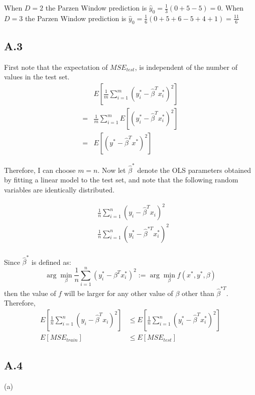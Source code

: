 \documentclass{article}
\begin{document}
    When $D=2$ the Parzen Window prediction is $\hat{y}_0 = \frac{1}{3}(0+5-5) = 0$.
    When $D=3$ the Parzen Window prediction is $\hat{y}_0 = \frac{1}{6}(0+5+6-5+4+1) = \frac{11}{6}$

    \subsection{A.3}

    First note that the expectation of $MSE_{test}$, 
     is independent of the number of values in the test set.
     \[\begin{aligned}
        & E \left[ \frac{1}{m} \sum_{i=1}^m (y^*_i-\hat{\beta}^Tx^*_i)^2 \right] \\
        = &  \frac{1}{m} \sum_{i=1}^m E \left[(y^*_i-\hat{\beta}^Tx^*_i)^2 \right]\\
        = &   E \left[(y^*-\hat{\beta}^Tx^*)^2 \right]
     \end{aligned}
    \]

    Therefore, I can choose $m=n$. Now let $\hat{\beta}^{*}$ denote the OLS parameters  
    obtained by fitting a linear model to the test set, and note that the following random variables are identically distributed.

    \[\begin{aligned}
        & \frac{1}{n} \sum_{i=1}^n (y_i-\hat{\beta}^Tx_i)^2 \\
        & \frac{1}{n} \sum_{i=1}^n (y^*_i-\hat{\beta}^{*T}x^*_i)^2 \\
     \end{aligned}
    \]

    Since $\hat{\beta}^{*}$ is defined as:
    \[\arg\min_{\beta}\frac{1}{n} \sum_{i=1}^n (y^*_i-\beta^Tx^*_i)^2 := \arg\min_{\beta} f(x^*, y^*, \beta)\] 
    then the value of $f$ will be larger for any other value of $\beta$ other than $\hat{\beta}^{*T}$.
    Therefore,
    \[
        \begin{aligned}
            E\left[\frac{1}{n} \sum_{i=1}^n (y_i-\hat{\beta}^Tx_i)^2 \right] &\leq E\left[\frac{1}{n} \sum_{i=1}^n (y^*_i-\hat{\beta}^Tx^*_i)^2 \right]\\
            E[MSE_{train}] &\leq E[MSE_{test}]
        \end{aligned}
    \]

    \subsection{A.4}

    (a) 
    
\end{document}
